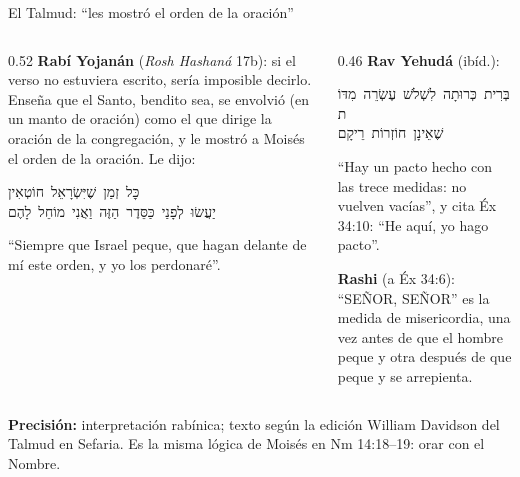 \documentclass[hyperref={bookmarks=false},aspectratio=169]{beamer}
\newcommand{\heb}[1]{\mbox{\foreignlanguage{hebrew}{#1}}}
\newcommand{\SENOR}{S{\fontsize{0.78em}{1em}\selectfont EÑOR}}
\newcommand{\precision}[1]{{\footnotesize\color{gris}\textbf{Precisión:} #1}}
\begin{document}
\begin{frame}{El Talmud: ``les mostró el orden de la oración''}
\begin{columns}[t,onlytextwidth]
\begin{column}{0.52\textwidth}\small
\textbf{Rabí Yojanán} (\emph{Rosh Hashaná} 17b): si el verso no estuviera escrito, sería imposible decirlo. Enseña que el Santo, bendito sea, se envolvió (en un manto de oración) como el que dirige la oración de la congregación, y le mostró a Moisés el orden de la oración. Le dijo:
\begin{center}\heb{כׇּל זְמַן שֶׁיִּשְׂרָאֵל חוֹטְאִין}\\ \heb{יַעֲשׂוּ לְפָנַי כַּסֵּדֶר הַזֶּה וַאֲנִי מוֹחֵל לָהֶם}\end{center}
``Siempre que Israel peque, que hagan delante de mí este orden, y yo los perdonaré''.
\end{column}
\begin{column}{0.46\textwidth}\small
\textbf{Rav Yehudá} (ibíd.):
\begin{center}\heb{בְּרִית כְּרוּתָה לִשְׁלֹשׁ עֶשְׂרֵה מִדּוֹת}\\ \heb{שֶׁאֵינָן חוֹזְרוֹת רֵיקָם}\end{center}
``Hay un pacto hecho con las trece medidas: no vuelven vacías'', y cita Éx 34:10: ``He aquí, yo hago pacto''.\par\medskip
\textbf{Rashi} (a Éx 34:6): ``\SENOR, \SENOR'' es la medida de misericordia, una vez antes de que el hombre peque y otra después de que peque y se arrepienta.
\end{column}
\end{columns}\par\smallskip
\precision{interpretación rabínica; texto según la edición William Davidson del Talmud en Sefaria. Es la misma lógica de Moisés en Nm 14:18--19: orar con el Nombre.}
\end{frame}
\end{document}
